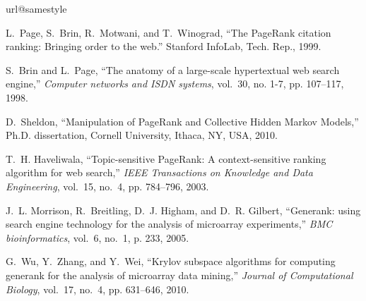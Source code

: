 \documentclass[conference]{IEEEtran}
\begin{document}
%

%


\nocite{*}
\ifdefined\hpec
\begin{thebibliography}{10}
\providecommand{\url}[1]{#1}
\csname url@samestyle\endcsname
\providecommand{\newblock}{\relax}
\providecommand{\bibinfo}[2]{#2}
\providecommand{\BIBentrySTDinterwordspacing}{\spaceskip=0pt\relax}
\providecommand{\BIBentryALTinterwordstretchfactor}{4}
\providecommand{\BIBentryALTinterwordspacing}{\spaceskip=\fontdimen2\font plus
\BIBentryALTinterwordstretchfactor\fontdimen3\font minus
  \fontdimen4\font\relax}
\providecommand{\BIBforeignlanguage}[2]{{%
\expandafter\ifx\csname l@#1\endcsname\relax
\typeout{** WARNING: IEEEtran.bst: No hyphenation pattern has been}%
\typeout{** loaded for the language `#1'. Using the pattern for}%
\typeout{** the default language instead.}%
\else
\language=\csname l@#1\endcsname
\fi
#2}}
\providecommand{\BIBdecl}{\relax}
\BIBdecl

L.~Page, S.~Brin, R.~Motwani, and T.~Winograd, ``The {P}age{R}ank citation
  ranking: Bringing order to the web.'' Stanford InfoLab, Tech. Rep., 1999.

S.~Brin and L.~Page, ``The anatomy of a large-scale hypertextual web search
  engine,'' \emph{Computer networks and ISDN systems}, vol.~30, no. 1-7, pp.
  107--117, 1998.

D.~Sheldon, ``Manipulation of {P}age{R}ank and {C}ollective {H}idden {M}arkov
  {M}odels,'' Ph.D. dissertation, Cornell University, Ithaca, NY, USA, 2010.

T.~H. Haveliwala, ``Topic-sensitive {P}age{R}ank: A context-sensitive ranking
  algorithm for web search,'' \emph{IEEE Transactions on Knowledge and Data
  Engineering}, vol.~15, no.~4, pp. 784--796, 2003.

J.~L. Morrison, R.~Breitling, D.~J. Higham, and D.~R. Gilbert, ``Generank:
  using search engine technology for the analysis of microarray experiments,''
  \emph{BMC bioinformatics}, vol.~6, no.~1, p. 233, 2005.

G.~Wu, Y.~Zhang, and Y.~Wei, ``Krylov subspace algorithms for computing
  generank for the analysis of microarray data mining,'' \emph{Journal of
  Computational Biology}, vol.~17, no.~4, pp. 631--646, 2010.


\end{thebibliography}
\end{document}
